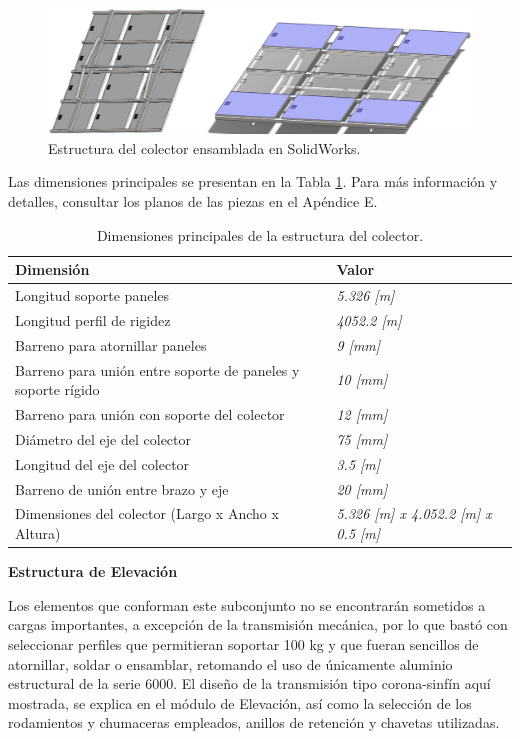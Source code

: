 \begin{figure}[H]
	\centering
	\includegraphics[width=\columnwidth]{imagenes/colec6}
	\caption{Estructura del colector ensamblada en SolidWorks.}
	\label{fig:colec6}
\end{figure}

Las dimensiones principales se presentan en la Tabla \ref{tab:colec_medidas}. Para más información y detalles, consultar los planos de las piezas en el Apéndice E.

\begin{table}[H]
  \centering
  \caption{Dimensiones principales de la estructura del colector.}
    \begin{tabular}{|p{8cm}|p{5cm}|}
    \hline
    \textbf{Dimensión} & \textbf{Valor} \\
    \hline \hline
    Longitud soporte paneles & \textit{5.326 [m]} \\
    \hline
    Longitud perfil de rigidez & \textit{4052.2 [m]} \\
    \hline
    Barreno para atornillar paneles & \textit{9 [mm]} \\
    \hline
    Barreno para unión entre soporte de paneles y soporte rígido & \textit{10 [mm]} \\
    \hline
    Barreno para unión con soporte del colector & \textit{12 [mm]} \\
    \hline
    Diámetro del eje del colector & \textit{75 [mm]} \\
    \hline
    Longitud del eje del colector & \textit{3.5 [m]} \\
    \hline
    Barreno de unión entre brazo y eje & \textit{20 [mm]} \\
    \hline
    Dimensiones del colector (Largo x Ancho x Altura) & \textit{5.326 [m] x 4.052.2 [m] x 0.5 [m]} \\
    \hline
    \end{tabular}%
  \label{tab:colec_medidas}%
\end{table}%

\newpage
\textbf{Estructura de Elevación}

Los elementos que conforman este subconjunto no se encontrarán sometidos a cargas importantes, a excepción de la transmisión mecánica, por lo que bastó con seleccionar perfiles que permitieran soportar 100 kg y que fueran sencillos de atornillar, soldar o ensamblar, retomando el uso de únicamente aluminio estructural de la serie 6000. El diseño de la transmisión tipo corona-sinfín aquí mostrada, se explica en el módulo de Elevación, así como la selección de los rodamientos y chumaceras empleados, anillos de retención y chavetas utilizadas.\\

